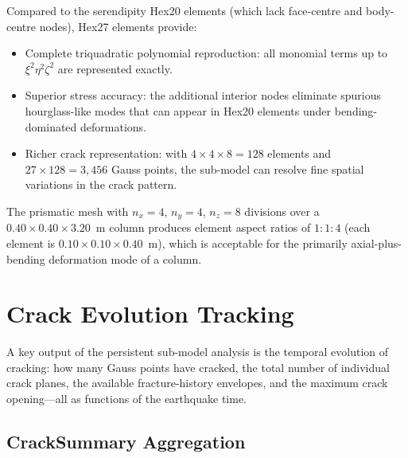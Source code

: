 Compared to the serendipity Hex20 elements (which lack face-centre
and body-centre nodes), Hex27 elements provide:
\begin{itemize}
  \item Complete triquadratic polynomial reproduction: all monomial
        terms up to $\xi^2\eta^2\zeta^2$ are represented exactly.
  \item Superior stress accuracy: the additional interior nodes
        eliminate spurious hourglass-like modes that can appear in
        Hex20 elements under bending-dominated deformations.
  \item Richer crack representation: with $4 \times 4 \times 8 = 128$
        elements and $27 \times 128 = 3{,}456$ Gauss points, the
        sub-model can resolve fine spatial variations in the crack
        pattern.
\end{itemize}

The prismatic mesh with $n_x = 4$, $n_y = 4$, $n_z = 8$ divisions
over a $0.40 \times 0.40 \times 3.20$~m column produces element
aspect ratios of $1{:}1{:}4$ (each element is
$0.10 \times 0.10 \times 0.40$~m), which is acceptable for the
primarily axial-plus-bending deformation mode of a column.


\section{Crack Evolution Tracking}
\label{sec:nlevo-crack-evolution}

A key output of the persistent sub-model analysis is the temporal
evolution of cracking: how many Gauss points have cracked, the total
number of individual crack planes, the available fracture-history
envelopes, and the maximum crack opening---all as functions of the
earthquake time.

\subsection{CrackSummary Aggregation}

